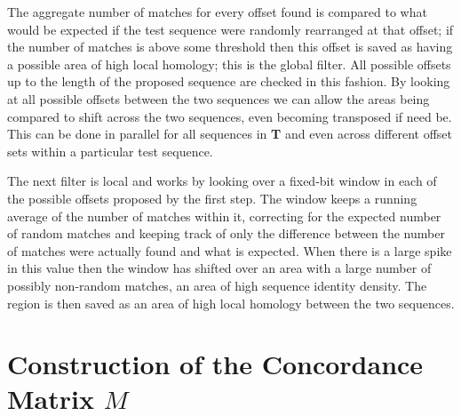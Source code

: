 \documentclass[phd,tocprelim]{cornell}
\begin{document}
The aggregate number of matches for every offset found is compared to what would be expected if the test sequence were randomly rearranged at that offset; if the number of matches is above some threshold then this offset is saved as having a possible area of high local homology; this is the global filter. All possible offsets up to the length of the proposed sequence are checked in this fashion. By looking at all possible offsets between the two sequences we can allow the areas being compared to shift across the two sequences, even becoming transposed if need be. This can be done in parallel for all sequences in \textbf{T} and even across different offset sets within a particular test sequence.

The next filter is local and works by looking over a fixed-bit window in each of the possible offsets proposed by the first step. The window keeps a running average of the number of matches within it, correcting for the expected number of random matches and keeping track of only the difference between the number of matches were actually found and what is expected. When there is a large spike in this value then the window has shifted over an area with a large number of possibly non-random matches, an area of high sequence identity density. The region is then saved as an area of high local homology between the two sequences.

\section{Construction of the Concordance Matrix $M$}
\end{document}
